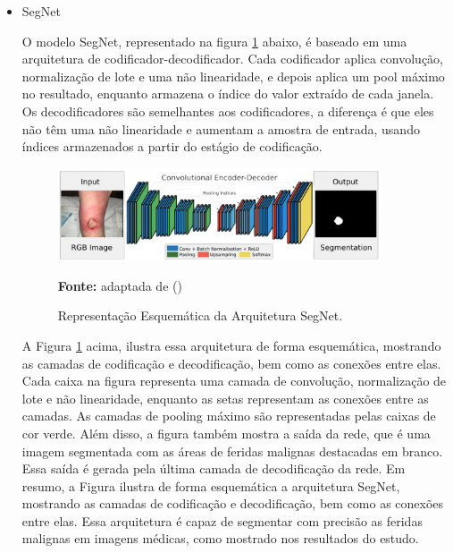 \begin{itemize}
    
        
        \item {SegNet}
    
            O modelo \ac{SegNet}, representado na figura \ref{fig:arquiteturaSegNet} abaixo,  é baseado em uma arquitetura de codificador-decodificador. Cada codificador aplica convolução, normalização de lote e uma não linearidade, e depois aplica um pool máximo no resultado, enquanto armazena o índice do valor extraído de cada janela. Os decodificadores são semelhantes aos codificadores, a diferença é que eles não têm uma não linearidade e aumentam a amostra de entrada, usando índices armazenados a partir do estágio de codificação.
    
            \begin{figure}[htbp]
                \centering
                \caption{Representação Esquemática da Arquitetura \ac{SegNet}.}
                \includegraphics[width=0.9\textwidth]{img/arquitetura_Seg-Net.png}
                \label{fig:arquiteturaSegNet}
                \par\medskip\textbf{Fonte:} adaptada de (\cite{badrinarayanan2017deep})
            \end{figure}
            
                A Figura \ref{fig:arquiteturaSegNet} acima, ilustra essa arquitetura de forma esquemática, mostrando as camadas de codificação e decodificação, bem como as conexões entre elas. Cada caixa na figura representa uma camada de convolução, normalização de lote e não linearidade, enquanto as setas representam as conexões entre as camadas. As camadas de pooling máximo são representadas pelas caixas de cor verde. Além disso, a figura também mostra a saída da rede, que é uma imagem segmentada com as áreas de feridas malignas destacadas em branco. Essa saída é gerada pela última camada de decodificação da rede.
                Em resumo, a Figura ilustra de forma esquemática a arquitetura \ac{SegNet}, mostrando as camadas de codificação e decodificação, bem como as conexões entre elas. Essa arquitetura é capaz de segmentar com precisão as feridas malignas em imagens médicas, como mostrado nos resultados do estudo.
    

\end{itemize}
